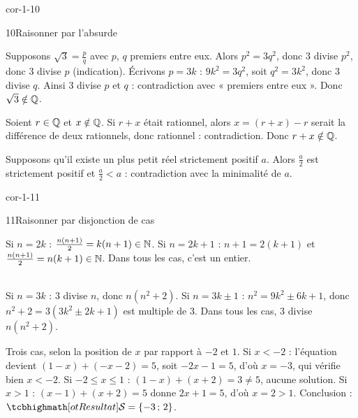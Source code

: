 \begin{blocLivre}{cor-1-10}
\begin{corrige}{10}{Raisonner par l'absurde}
\begin{questions}
  \item Supposons $\sqrt{3}=\frac{p}{q}$ avec $p$, $q$ premiers entre eux. Alors $p^{2}=3q^{2}$, donc $3$
    divise $p^{2}$, donc $3$ divise $p$ (indication). Écrivons $p=3k$ : $9k^{2}=3q^{2}$, soit
    $q^{2}=3k^{2}$, donc $3$ divise $q$. Ainsi $3$ divise $p$ et $q$ : contradiction avec « premiers entre
    eux ». Donc $\sqrt{3}\notin\mathbb{Q}$.
  \item Soient $r\in\mathbb{Q}$ et $x\notin\mathbb{Q}$. Si $r+x$ était rationnel, alors $x=(r+x)-r$ serait la différence
    de deux rationnels, donc rationnel : contradiction. Donc $r+x\notin\mathbb{Q}$.
  \item Supposons qu'il existe un plus petit réel strictement positif $a$. Alors $\frac{a}{2}$ est
    strictement positif et $\frac{a}{2}<a$ : contradiction avec la minimalité de $a$.
\end{questions}
\end{corrige}
\end{blocLivre}

\begin{blocLivre}{cor-1-11}
\begin{corrige}{11}{Raisonner par disjonction de cas}
\begin{questions}
  \item Si $n=2k$ : $\frac{n(n+1)}{2}=k(n+1)\in\mathbb{N}$. Si $n=2k+1$ : $n+1=2(k+1)$ et
    $\frac{n(n+1)}{2}=n(k+1)\in\mathbb{N}$. Dans tous les cas, c'est un entier.
  \item {}\\
    Si $n=3k$ : $3$ divise $n$, donc $n(n^{2}+2)$. Si $n=3k\pm1$ : $n^{2}=9k^{2}\pm6k+1$, donc
    $n^{2}+2=3(3k^{2}\pm2k+1)$ est multiple de $3$. Dans tous les cas, $3$ divise $n(n^{2}+2)$.
  \item Trois cas, selon la position de $x$ par rapport à $-2$ et $1$.
    Si $x<-2$ : l'équation devient $(1-x)+(-x-2)=5$, soit $-2x-1=5$, d'où $x=-3$, qui vérifie bien
    $x<-2$. Si $-2\leq x\leq1$ : $(1-x)+(x+2)=3\neq5$, aucune solution. Si $x>1$ : $(x-1)+(x+2)=5$
    donne $2x+1=5$, d'où $x=2>1$. Conclusion : $\res{\mathcal{S}=\ens{-3\,;\,2}}$.
\end{questions}
\end{corrige}
\end{blocLivre}

